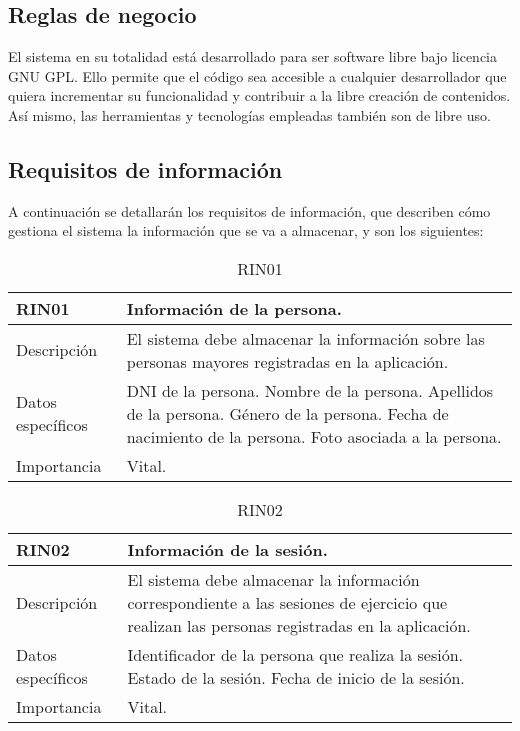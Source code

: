 \subsection{Reglas de negocio}

El sistema en su totalidad está desarrollado para ser software libre bajo licencia GNU GPL. Ello permite que el código sea accesible a cualquier desarrollador que quiera incrementar su funcionalidad y contribuir a la libre creación de contenidos. Así mismo, las herramientas y tecnologías empleadas también son de libre uso.

\subsection{Requisitos de información}

A continuación se detallarán los requisitos de información, que describen cómo gestiona el sistema la información que se va a almacenar, y son los siguientes:

\begin{table}[H]
\label{RIN01}
\begin{center}
\begin{tabular}{| l | p{10cm} |}
\hline
RIN01 & Información de la persona.\\
\hline
Descripción & El sistema debe almacenar la información sobre las personas mayores registradas en la aplicación.\\
\hline
Datos específicos & DNI de la persona.
\newline Nombre de la persona.
\newline Apellidos de la persona.
\newline Género de la persona.
\newline Fecha de nacimiento de la persona.
\newline Foto asociada a la persona.\\
\hline
Importancia & Vital.\\
\hline
\end{tabular}
\end{center}
\caption{RIN01}
\end{table} 

\begin{table}[H]
\label{RIN02}
\begin{center}
\begin{tabular}{| l | p{10cm} |}
\hline
RIN02 & Información de la sesión.\\
\hline
Descripción & El sistema debe almacenar la información correspondiente a las sesiones de ejercicio que realizan las personas registradas en la aplicación.\\
\hline
Datos específicos & Identificador de la persona que realiza la sesión.
\newline Estado de la sesión.
\newline Fecha de inicio de la sesión.\\
\hline
Importancia & Vital.\\
\hline
\end{tabular}
\end{center}
\caption{RIN02}
\end{table} 

